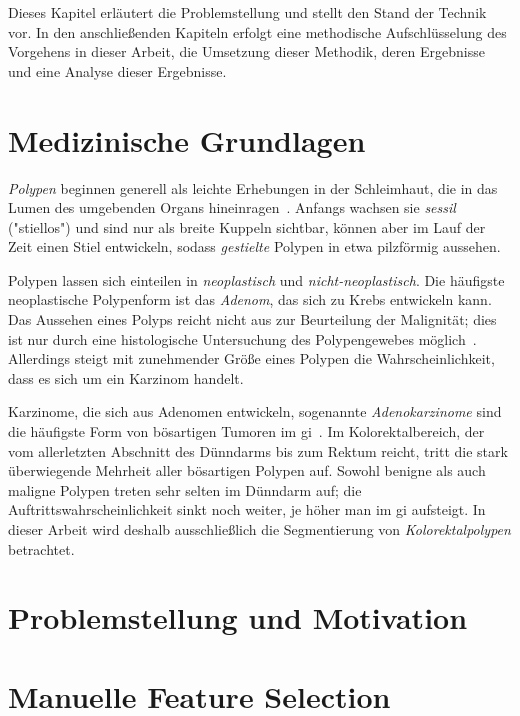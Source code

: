 Dieses Kapitel erläutert die Problemstellung und stellt den Stand der Technik vor.
In den anschließenden Kapiteln erfolgt eine methodische Aufschlüsselung des Vorgehens in dieser Arbeit, die Umsetzung dieser Methodik, deren Ergebnisse und eine Analyse dieser Ergebnisse.



\section{Medizinische Grundlagen}

\emph{Polypen} beginnen generell als leichte Erhebungen in der Schleimhaut, die in das Lumen des umgebenden Organs hineinragen~\cite{Kumar.2005}.
Anfangs wachsen sie \emph{sessil} ("stiellos") und sind nur als breite Kuppeln sichtbar, können aber im Lauf der Zeit einen Stiel entwickeln, sodass \emph{gestielte} Polypen in etwa pilzförmig aussehen.

Polypen lassen sich einteilen in \emph{neoplastisch} und \emph{nicht-neoplastisch}.
Die häufigste neoplastische Polypenform ist das \emph{Adenom}, das sich zu Krebs entwickeln kann.
Das Aussehen eines Polyps reicht nicht aus zur Beurteilung der Malignität; dies ist nur durch eine histologische Untersuchung des Polypengewebes möglich~\cite{Kumar.2005}.
Allerdings steigt mit zunehmender Größe eines Polypen die Wahrscheinlichkeit, dass es sich um ein Karzinom handelt.

Karzinome, die sich aus Adenomen entwickeln, sogenannte \emph{Adenokarzinome} sind die häufigste Form von bösartigen Tumoren im \gls{gi}~\cite{Kumar.2005}.
Im Kolorektalbereich, der vom allerletzten Abschnitt des Dünndarms bis zum Rektum reicht, tritt die stark überwiegende Mehrheit aller bösartigen Polypen auf.
Sowohl benigne als auch maligne Polypen treten sehr selten im Dünndarm auf; die Auftrittswahrscheinlichkeit sinkt noch weiter, je höher man im \gls{gi} aufsteigt.
In dieser Arbeit wird deshalb ausschließlich die Segmentierung von \emph{Kolorektalpolypen} betrachtet.



\section{Problemstellung und Motivation}





\section{Manuelle Feature Selection}\label{sec:manuelle-feature-selection}




